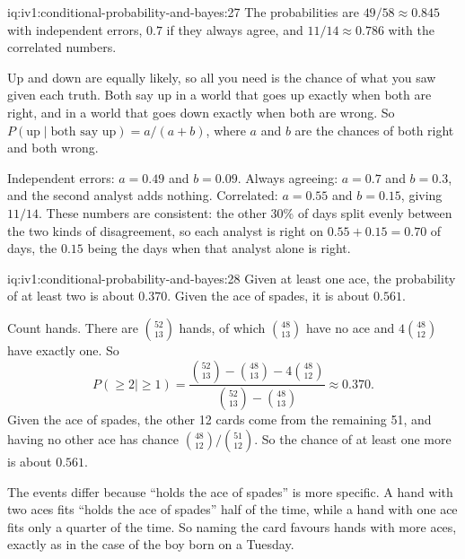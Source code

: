 \begin{solution}{iq:iv1:conditional-probability-and-bayes:27}
The probabilities are $49/58 \approx 0.845$ with independent errors, $0.7$ if they always agree, and $11/14 \approx 0.786$ with the correlated numbers.

Up and down are equally likely, so all you need is the chance of what you saw given each truth. Both say up in a world that goes up exactly when both are right, and in a world that goes down exactly when both are wrong. So $P(\text{up} \mid \text{both say up}) = a/(a + b)$, where $a$ and $b$ are the chances of both right and both wrong.

Independent errors: $a = 0.49$ and $b = 0.09$. Always agreeing: $a = 0.7$ and $b = 0.3$, and the second analyst adds nothing. Correlated: $a = 0.55$ and $b = 0.15$, giving $11/14$. These numbers are consistent: the other 30\% of days split evenly between the two kinds of disagreement, so each analyst is right on $0.55 + 0.15 = 0.70$ of days, the $0.15$ being the days when that analyst alone is right.

\end{solution}

\begin{solution}{iq:iv1:conditional-probability-and-bayes:28}
Given at least one ace, the probability of at least two is about $0.370$. Given the ace of spades, it is about $0.561$.

Count hands. There are $\binom{52}{13}$ hands, of which $\binom{48}{13}$ have no ace and $4\binom{48}{12}$ have exactly one. So
\[
P(\ge 2 \mid \ge 1) = \frac{\binom{52}{13} - \binom{48}{13} - 4\binom{48}{12}}{\binom{52}{13} - \binom{48}{13}} \approx 0.370.
\]
Given the ace of spades, the other 12 cards come from the remaining 51, and having no other ace has chance $\binom{48}{12}/\binom{51}{12}$. So the chance of at least one more is about $0.561$.

The events differ because ``holds the ace of spades'' is more specific. A hand with two aces fits ``holds the ace of spades'' half of the time, while a hand with one ace fits only a quarter of the time. So naming the card favours hands with more aces, exactly as in the case of the boy born on a Tuesday.

\end{solution}

